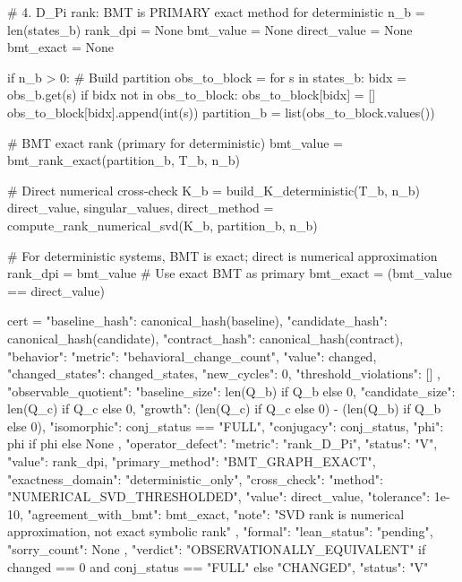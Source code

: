 # 4. D_Pi rank: BMT is PRIMARY exact method for deterministic  
n_b = len(states_b)  
rank_dpi = None  
bmt_value = None  
direct_value = None  
bmt_exact = None  
  
if n_b > 0:  
    # Build partition  
    obs_to_block = {}  
    for s in states_b:  
        bidx = obs_b.get(s)  
        if bidx not in obs_to_block:  
            obs_to_block[bidx] = []  
        obs_to_block[bidx].append(int(s))  
    partition_b = list(obs_to_block.values())  
      
    # BMT exact rank (primary for deterministic)  
    bmt_value = bmt_rank_exact(partition_b, T_b, n_b)  
      
    # Direct numerical cross-check  
    K_b = build_K_deterministic(T_b, n_b)  
    direct_value, singular_values, direct_method = compute_rank_numerical_svd(K_b, partition_b, n_b)  
      
    # For deterministic systems, BMT is exact; direct is numerical approximation  
    rank_dpi = bmt_value  # Use exact BMT as primary  
    bmt_exact = (bmt_value == direct_value)  
  
cert = {  
    "baseline_hash": canonical_hash(baseline),  
    "candidate_hash": canonical_hash(candidate),  
    "contract_hash": canonical_hash(contract),  
    "behavior": {  
        "metric": "behavioral_change_count",  
        "value": changed,  
        "changed_states": changed_states,  
        "new_cycles": 0,  
        "threshold_violations": []  
    },  
    "observable_quotient": {  
        "baseline_size": len(Q_b) if Q_b else 0,  
        "candidate_size": len(Q_c) if Q_c else 0,  
        "growth": (len(Q_c) if Q_c else 0) - (len(Q_b) if Q_b else 0),  
        "isomorphic": conj_status == "FULL",  
        "conjugacy": conj_status,  
        "phi": phi if phi else None  
    },  
    "operator_defect": {  
        "metric": "rank_D_Pi",  
        "status": "V",  
        "value": rank_dpi,  
        "primary_method": "BMT_GRAPH_EXACT",  
        "exactness_domain": "deterministic_only",  
        "cross_check": {  
            "method": "NUMERICAL_SVD_THRESHOLDED",  
            "value": direct_value,  
            "tolerance": 1e-10,  
            "agreement_with_bmt": bmt_exact,  
            "note": "SVD rank is numerical approximation, not exact symbolic rank"  
        }  
    },  
    "formal": {  
        "lean_status": "pending",  
        "sorry_count": None  
    },  
    "verdict": "OBSERVATIONALLY_EQUIVALENT" if changed == 0 and conj_status == "FULL" else "CHANGED",  
    "status": "V"  
}  
  
